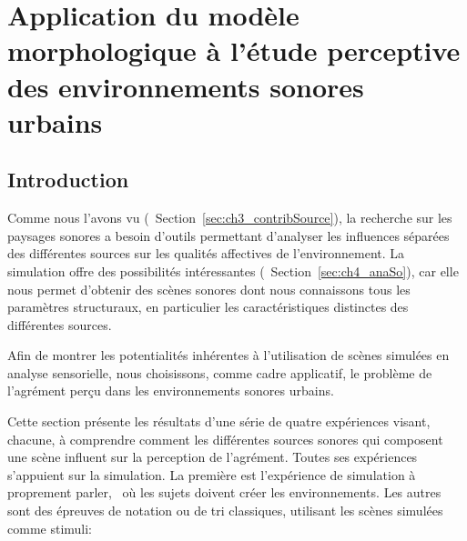 \chapter[Application à l’étude perceptive des environnements sonores urbains]{Application du modèle morphologique à l’étude perceptive des environnements sonores urbains}\label{ch:psycho_xp}

\section{Introduction}

Comme nous l'avons vu (\cf~Section~\ref{sec:ch3_contribSource}), la recherche sur les paysages sonores a besoin d'outils permettant d'analyser les influences séparées des différentes sources sur les qualités affectives de l'environnement. La simulation offre des possibilités intéressantes (\cf~Section~\ref{sec:ch4_anaSo}), car elle nous permet d'obtenir des scènes sonores dont nous connaissons tous les paramètres structuraux, en particulier les caractéristiques distinctes des différentes sources. 
 
Afin de montrer les potentialités inhérentes à l'utilisation de scènes simulées en analyse sensorielle, nous choisissons, comme cadre applicatif, le problème de l'agrément perçu dans les environnements sonores urbains. 

Cette section présente les résultats d'une série de quatre expériences visant, chacune, à comprendre comment les différentes sources sonores qui composent une scène influent sur la perception de l'agrément. Toutes ses expériences s'appuient sur la simulation. La première est l'expérience de simulation à proprement parler, \ie~où les sujets doivent créer les environnements. Les autres sont des épreuves de notation ou de tri classiques, utilisant les scènes simulées comme stimuli:

